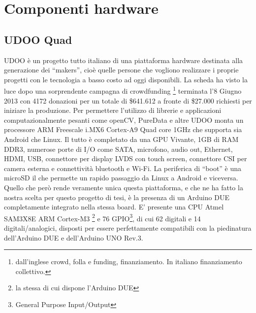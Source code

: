 \chapter{Componenti hardware}
\fancyfoot[C]{\thepage } 
\section{UDOO Quad}
UDOO è un progetto tutto italiano di una piattaforma hardware destinata alla 
generazione dei ``makers'', cioè quelle persone che vogliono realizzare i 
proprie progetti con le tecnologia a basso costo ad oggi disponibili. La 
scheda ha visto la luce dopo una sorprendente campagna di crowdfunding
\footnote{dall'inglese crowd, folla e funding, finanziamento. In italiano finanziamento collettivo.} terminata l'8 Giugno 2013 con 4172 donazioni per un totale di \$641.612 a fronte di \$27.000 richiesti per iniziare la produzione. Per permettere l'utilizzo di librerie e applicazioni computazionalmente pesanti 
come openCV, PureData e altre UDOO monta un processore ARM Freescale i.MX6 
Cortex-A9 Quad core 1GHz che supporta sia Android che Linux. Il tutto è 
completato da una GPU Vivante, 1GB di RAM DDR3, numerose porte di I/O come 
SATA, microfono, audio out, Ethernet, HDMI, USB, connettore per display LVDS 
con touch screen, connettore CSI per camera esterna e connettività bluetooth e 
Wi-Fi. La periferica di ``boot'' è una microSD il che permette un rapido 
passaggio da Linux a Android e viceversa. Quello che però rende veramente 
unica questa piattaforma, e che ne ha fatto la nostra scelta per questo 
progetto di tesi, è la presenza di un Arduino DUE completamente integrato 
nella stessa board. 
E' presente una CPU Atmel SAM3X8E ARM Cortex-M3 \footnote{la stessa di cui 
dispone l'Arduino DUE} e 76 GPIO\footnote{General Purpose Input/Output}, di 
cui 62 digitali e 14 digitali/analogici, disposti per essere perfettamente 
compatibili con la piedinatura dell'Arduino DUE e dell'Arduino UNO Rev.3.

